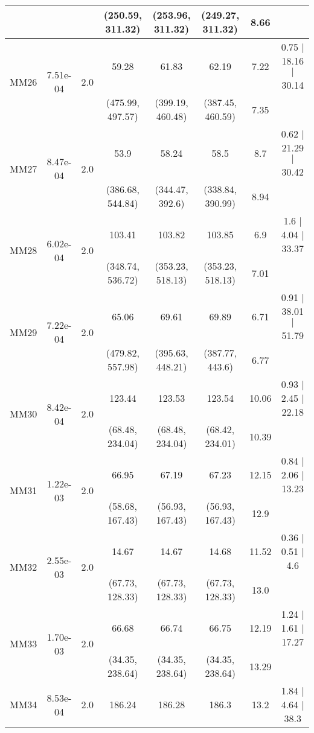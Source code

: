 \begin{longtable}{|c|c|c|c|c|c|c|c|}
	 &  &  & (250.59, 311.32) & (253.96, 311.32) & (249.27, 311.32) & 8.66 & \\
 	\hline
	\multirow{2}{*}{MM26} & \multirow{2}{*}{7.51e-04} & \multirow{2}{*}{2.0} & 59.28 & 61.83 & 62.19 & 7.22 & 0.75 $\mid$ 18.16 $\mid$ 30.14\\
	 &  &  & (475.99, 497.57) & (399.19, 460.48) & (387.45, 460.59) & 7.35 & \\
 	\hline
	\multirow{2}{*}{MM27} & \multirow{2}{*}{8.47e-04} & \multirow{2}{*}{2.0} & 53.9 & 58.24 & 58.5 & 8.7 & 0.62 $\mid$ 21.29 $\mid$ 30.42\\
	 &  &  & (386.68, 544.84) & (344.47, 392.6) & (338.84, 390.99) & 8.94 & \\
 	\hline
	\multirow{2}{*}{MM28} & \multirow{2}{*}{6.02e-04} & \multirow{2}{*}{2.0} & 103.41 & 103.82 & 103.85 & 6.9 & 1.6 $\mid$ 4.04 $\mid$ 33.37\\
	 &  &  & (348.74, 536.72) & (353.23, 518.13) & (353.23, 518.13) & 7.01 & \\
 	\hline
	\multirow{2}{*}{MM29} & \multirow{2}{*}{7.22e-04} & \multirow{2}{*}{2.0} & 65.06 & 69.61 & 69.89 & 6.71 & 0.91 $\mid$ 38.01 $\mid$ 51.79\\
	 &  &  & (479.82, 557.98) & (395.63, 448.21) & (387.77, 443.6) & 6.77 & \\
 	\hline
	\multirow{2}{*}{MM30} & \multirow{2}{*}{8.42e-04} & \multirow{2}{*}{2.0} & 123.44 & 123.53 & 123.54 & 10.06 & 0.93 $\mid$ 2.45 $\mid$ 22.18\\
	 &  &  & (68.48, 234.04) & (68.48, 234.04) & (68.42, 234.01) & 10.39 & \\
 	\hline
	\multirow{2}{*}{MM31} & \multirow{2}{*}{1.22e-03} & \multirow{2}{*}{2.0} & 66.95 & 67.19 & 67.23 & 12.15 & 0.84 $\mid$ 2.06 $\mid$ 13.23\\
	 &  &  & (58.68, 167.43) & (56.93, 167.43) & (56.93, 167.43) & 12.9 & \\
 	\hline
	\multirow{2}{*}{MM32} & \multirow{2}{*}{2.55e-03} & \multirow{2}{*}{2.0} & 14.67 & 14.67 & 14.68 & 11.52 & 0.36 $\mid$ 0.51 $\mid$ 4.6\\
	 &  &  & (67.73, 128.33) & (67.73, 128.33) & (67.73, 128.33) & 13.0 & \\
 	\hline
	\multirow{2}{*}{MM33} & \multirow{2}{*}{1.70e-03} & \multirow{2}{*}{2.0} & 66.68 & 66.74 & 66.75 & 12.19 & 1.24 $\mid$ 1.61 $\mid$ 17.27\\
	 &  &  & (34.35, 238.64) & (34.35, 238.64) & (34.35, 238.64) & 13.29 & \\
 	\hline
	\multirow{2}{*}{MM34} & \multirow{2}{*}{8.53e-04} & \multirow{2}{*}{2.0} & 186.24 & 186.28 & 186.3 & 13.2 & 1.84 $\mid$ 4.64 $\mid$ 38.3\\

\end{longtable}
